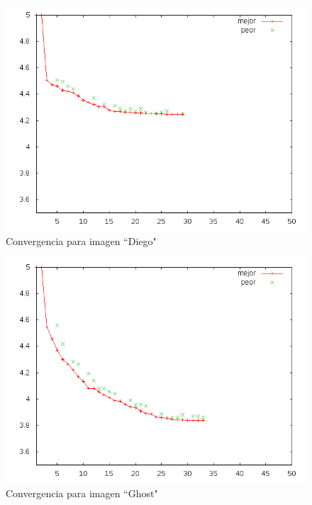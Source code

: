 \begin{figure}[b]
    \includegraphics[width=1.0\textwidth]{plot_diego}
    \caption{Convergencia para imagen ``Diego"}
    \label{img:plot-diego}
\end{figure}

\begin{figure}[b]
    \includegraphics[width=1.0\textwidth]{plot_ghost}
    \caption{Convergencia para imagen ``Ghost"}
    \label{img:plot-ghost}
\end{figure}

